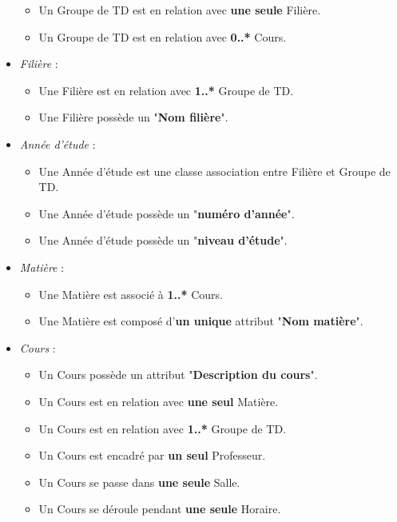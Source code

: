 \documentclass[a4paper, 11pt]{article}
\begin{document}
\begin{itemize}
\begin{itemize}
                \item Un Groupe de TD est en relation avec \textbf{une seule} Filière.
                \item Un Groupe de TD est en relation avec \textbf{0..*} Cours.
                \end{itemize}
        \item \textit{Filière} :
                \begin{itemize}
                \item Une Filière est en relation avec \textbf{1..*} Groupe de TD.
                \item Une Filière possède un "\textbf{Nom filière}".
                \end{itemize}
        \item \textit{Année d'étude} :
                \begin{itemize}
                \item Une Année d'étude est une classe association entre Filière et Groupe de TD.
                \item Une Année d'étude possède un "\textbf{numéro d'année}".
                \item Une Année d'étude possède un "\textbf{niveau d'étude}".
                \end{itemize}
        \item \textit{Matière} :
                \begin{itemize}
                \item Une Matière est associé à \textbf{1..*} Cours.
                \item Une Matière est composé d'\textbf{un unique} attribut "\textbf{Nom matière}".
                \end{itemize}
        \item \textit{Cours} :
                \begin{itemize}
                \item Un Cours possède un attribut "\textbf{Description du cours}".
                \item Un Cours est en relation avec \textbf{une seul} Matière.
                \item Un Cours est en relation avec \textbf{1..*} Groupe de TD.
                \item Un Cours est encadré par \textbf{un seul} Professeur.
                \item Un Cours se passe dans \textbf{une seule} Salle.
                \item Un Cours se déroule pendant \textbf{une seule} Horaire.

\end{itemize}
\end{itemize}
\end{document}

